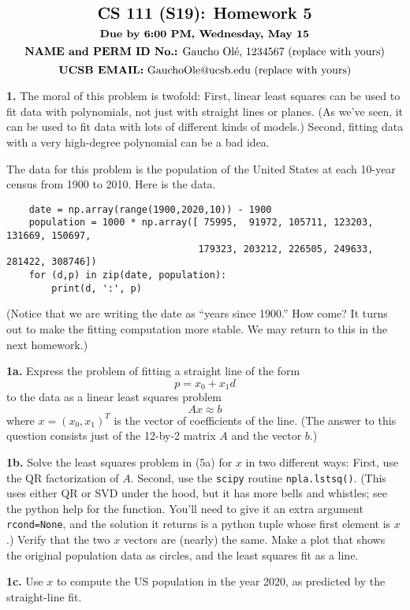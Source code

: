 \documentclass[11pt]{article}
\begin{document}
$$\mbox{\Large \textbf {CS 111 (S19): Homework 5}}$$
$$\mbox{\textbf {Due by 6:00 PM, Wednesday, May 15}}$$
$$\mbox{\textbf {NAME and PERM ID No.:} Gaucho Ol\'e, 1234567 (replace with yours)}$$
$$\mbox{\textbf {UCSB EMAIL:} GauchoOle@ucsb.edu (replace with yours)}$$

\par\bigskip
{\bf 1.}
The moral of this problem is twofold: 
First, linear least squares can be used to fit data with polynomials,
not just with straight lines or planes.
(As we've seen, it can be used to fit data with lots of different kinds of models.)
Second, fitting data with a very high-degree polynomial can be a bad idea.

The data for this problem is the population of the United States at each
10-year census from 1900 to 2010. Here is the data.
\begin{verbatim}
    date = np.array(range(1900,2020,10)) - 1900
    population = 1000 * np.array([ 75995,  91972, 105711, 123203, 131669, 150697, 
                                  179323, 203212, 226505, 249633, 281422, 308746])
    for (d,p) in zip(date, population):
        print(d, ':', p)
\end{verbatim}
(Notice that we are writing the date as ``years since 1900.''
How come?
It turns out to make the fitting computation more stable.
We may return to this in the next homework.)

\par\medskip
{\bf 1a.}
Express the problem of fitting a straight line of the form
$$ p = x_0 + x_1d$$
to the data as a linear least squares problem
$$A x \approx b$$
where $x = (x_0, x_1)^T$ is the vector of coefficients of the line.
(The answer to this question consists just of the 12-by-2 matrix $A$ 
and the vector $b$.)

\par\medskip
{\bf 1b.}
Solve the least squares problem in (5a) for $x$ in two different ways:
First, use the QR factorization of $A$.
Second, use the {\tt scipy} routine {\tt npla.lstsq()}.
(This uses either QR or SVD under the hood, but it has more
bells and whistles; see the python help for the function.
You'll need to give it an extra argument {\tt rcond=None},
and the solution it returns is a python tuple whose first element is $x$.)
Verify that the two $x$ vectors are (nearly) the same.
Make a plot that shows the original population data as circles,
and the least squares fit as a line.

\par\medskip
{\bf 1c.}
Use $x$ to compute the US population in the year 2020, 
as predicted by the straight-line fit.
\end{document}
